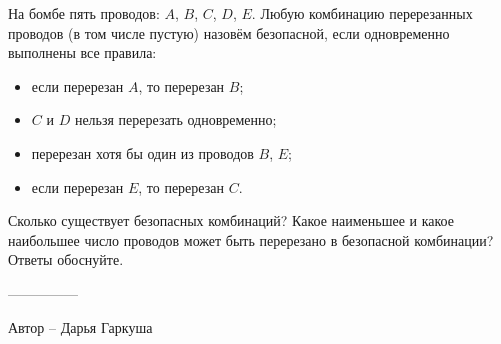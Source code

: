 \question
На бомбе пять проводов: $A$, $B$, $C$, $D$, $E$. Любую комбинацию перерезанных проводов (в том числе пустую) назовём безопасной, если одновременно выполнены все правила:
\begin{itemize}
    \item если перерезан $A$, то перерезан $B$;
    \item $C$ и $D$ нельзя перерезать одновременно;
    \item перерезан хотя бы один из проводов $B$, $E$;
    \item если перерезан $E$, то перерезан $C$.
\end{itemize}
Сколько существует безопасных комбинаций? Какое наименьшее и какое наибольшее число проводов может быть перерезано в безопасной комбинации? Ответы обоснуйте.

---------------

Автор -- Дарья Гаркуша